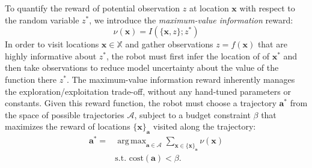 \documentclass{styles/svproc}
\DeclareMathOperator*{\argmax}{arg\,max} %
\newcommand{\x}{\mathbf{x}}
\begin{document}
To quantify the reward of potential observation $z$ at location $\x$ with respect to the random variable $z^*$, we introduce the \textit{maximum-value information} reward:
\begin{equation}
\nu(\x) = I(\{\x, z\} ; z^*)
\label{eq:mves}
\end{equation}
In order to visit locations $\x \in \mathbb{X}$ and gather observations $z = f(\x)$ that are highly informative about $z^*$, the robot must first infer the location of of $\x^*$ and then take observations to reduce model uncertainty about the value of the function there $z^*$. The maximum-value information reward inherently manages the exploration/exploitation trade-off, without any hand-tuned parameters or constants. %
Given this reward function, the robot must choose a trajectory $\mathbf{a}^*$ from the space of possible trajectories $\mathcal{A}$, subject to a budget constraint $\beta$ that maximizes the reward of locations $\{ \x \}_\mathbf{a}$ visited along the trajectory: 
\begin{equation}
\begin{split}
\mathbf{a}^* = & \argmax_{\mathbf{a} \in \mathcal{A}} \sum_{\x \in \{ \x \}_\mathbf{a}} \nu(\x) \\ 
& \text{s.t. } \text{cost}(\mathbf{a}) < \beta.
\end{split}
\label{eq:opt}
\end{equation}
\end{document}
